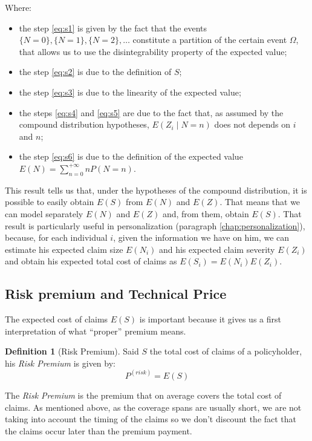 \documentclass[a4paper, nobind]{templates/ociamthesis}
\providecommand{\tightlist}{%
  \setlength{\itemsep}{0pt}\setlength{\parskip}{0pt}}
\theoremstyle{definition}
\newtheorem{definition}{Definition}[chapter]
\theoremstyle{definition}
\theoremstyle{definition}
\theoremstyle{remark}
\begin{document}
Where:

\begin{itemize}
\tightlist
\item
  the step \eqref{eq:s1} is given by the fact that the events \(\{N=0\}, \{N=1\}, \{N=2\}, \dots\) constitute a partition of the certain event \(\Omega\), that allows us to use the disintegrability property of the expected value;
\item
  the step \eqref{eq:s2} is due to the definition of \(S\);
\item
  the step \eqref{eq:s3} is due to the linearity of the expected value;
\item
  the steps \eqref{eq:s4} and \eqref{eq:s5} are due to the fact that, as assumed by the compound distribution hypotheses, \(E\left( Z_i \middle| N = n \right)\) does not depends on \(i\) and \(n\);
\item
  the step \eqref{eq:s6} is due to the definition of the expected value \(E(N)=\sum_{n=0}^{+\infty}{n P(N=n)}\).
\end{itemize}

This result tells us that, under the hypotheses of the compound distribution, it is possible to easily obtain \(E(S)\) from \(E(N)\) and \(E(Z)\). That means that we can model separately \(E(N)\) and \(E(Z)\) and, from them, obtain \(E(S)\). That result is particularly useful in personalization (paragraph \ref{chap:personalization}), because, for each individual \(i\), given the information we have on him, we can estimate his expected claim size \(E(N_i)\) and his expected claim severity \(E(Z_i)\) and obtain his expected total cost of claims as \(E(S_i) = E(N_i) E(Z_i)\).

\hypertarget{chap:risk-prem-tech-price}{%
\subsection{Risk premium and Technical Price}\label{chap:risk-prem-tech-price}}

The expected cost of claims \(E(S)\) is important because it gives us a first interpretation of what ``proper'' premium means.

\begin{definition}[Risk Premium]
\label{def:risk-premium} \iffalse (Risk Premium) \fi{} Said \(S\) the total cost of claims of a policyholder, his \emph{Risk Premium} is given by:
\[
P^{(risk)} = E(S)
\]
\end{definition}

The \emph{Risk Premium} is the premium that on average covers the total cost of claims. As mentioned above, as the coverage spans are usually short, we are not taking into account the timing of the claims so we don't discount the fact that the claims occur later than the premium payment.
\end{document}
